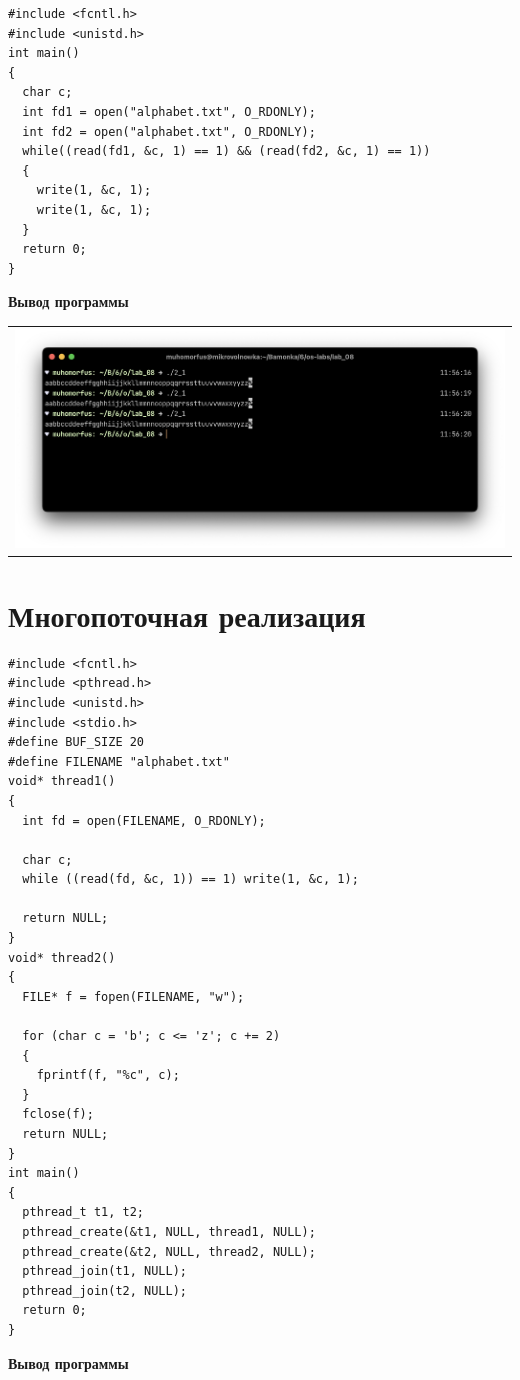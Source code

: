 \begin{lstlisting}
#include <fcntl.h>
#include <unistd.h>
int main()
{
  char c;    
  int fd1 = open("alphabet.txt", O_RDONLY);
  int fd2 = open("alphabet.txt", O_RDONLY);
  while((read(fd1, &c, 1) == 1) && (read(fd2, &c, 1) == 1))
  {
    write(1, &c, 1);
    write(1, &c, 1);
  }
  return 0;
}
\end{lstlisting}

\textbf{Вывод программы}

 \begin{table}[H]
	\centering
	\begin{tabular}{p{1\linewidth}}
		\centering
		\includegraphics[width=0.9\linewidth]{./images/3.png}
	\end{tabular}
\end{table}

\section{Многопоточная реализация}

\begin{lstlisting}
#include <fcntl.h>
#include <pthread.h>
#include <unistd.h>
#include <stdio.h>
#define BUF_SIZE 20
#define FILENAME "alphabet.txt"
void* thread1()
{
  int fd = open(FILENAME, O_RDONLY);

  char c;
  while ((read(fd, &c, 1)) == 1) write(1, &c, 1);

  return NULL;
}
void* thread2() 
{
  FILE* f = fopen(FILENAME, "w");

  for (char c = 'b'; c <= 'z'; c += 2)
  { 
    fprintf(f, "%c", c);
  }
  fclose(f);
  return NULL;
}
int main()
{
  pthread_t t1, t2;
  pthread_create(&t1, NULL, thread1, NULL);
  pthread_create(&t2, NULL, thread2, NULL);
  pthread_join(t1, NULL);
  pthread_join(t2, NULL);
  return 0;
}
\end{lstlisting}

\textbf{Вывод программы}

